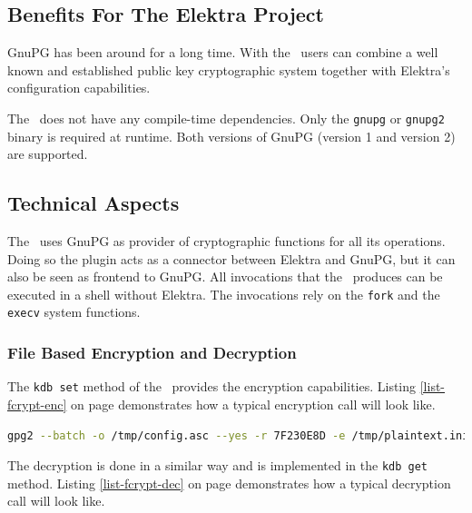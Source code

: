 \subsection{Benefits For The Elektra Project}

GnuPG has been around for a long time.
With the \fcrypt ~users can combine a well known and established public key cryptographic system together with Elektra's configuration capabilities.

The \fcrypt ~does not have any compile-time dependencies.
Only the \texttt{gnupg} or \texttt{gnupg2} binary is required at runtime.
Both versions of GnuPG (version 1 and version 2) are supported.

%

\subsection{Technical Aspects}

The \fcrypt ~uses GnuPG as provider of cryptographic functions for all its operations.
Doing so the plugin acts as a connector between Elektra and GnuPG, but it can also be seen as frontend to GnuPG.
All invocations that the \fcrypt ~produces can be executed in a shell without Elektra.
The invocations rely on the \texttt{fork} and the \texttt{execv} system functions.

\subsubsection{File Based Encryption and Decryption}

The \texttt{kdb set} method of the \fcrypt ~provides the encryption capabilities.
Listing \ref{list-fcrypt-enc} on page \pageref{list-fcrypt-enc} demonstrates how a typical encryption call will look like.

\begin{lstlisting}[label=list-fcrypt-enc,language=Bash,caption={Fcrypt: encryption command}]
gpg2 --batch -o /tmp/config.asc --yes -r 7F230E8D -e /tmp/plaintext.ini
\end{lstlisting}

The decryption is done in a similar way and is implemented in the \texttt{kdb get} method.
Listing \ref{list-fcrypt-dec} on page \pageref{list-fcrypt-dec} demonstrates how a typical decryption call will look like.


